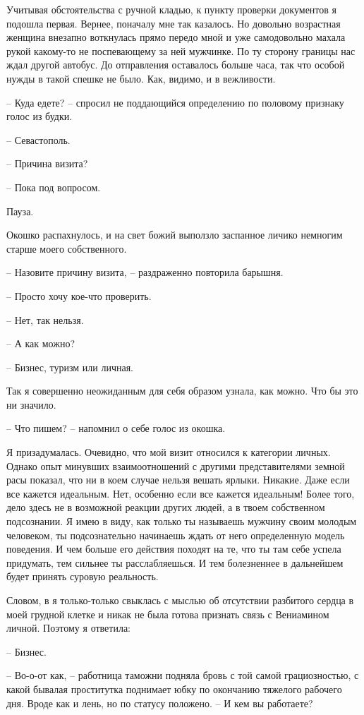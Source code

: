 \documentclass[
]{book}
\begin{document}
Учитывая обстоятельства с ручной кладью, к пункту проверки документов я подошла первая. Вернее, поначалу мне так казалось. Но довольно возрастная женщина внезапно воткнулась прямо передо мной и уже самодовольно махала рукой какому-то не поспевающему за ней мужчинке. По ту сторону границы нас ждал другой автобус. До отправления оставалось больше часа, так что особой нужды в такой спешке не было. Как, видимо, и в вежливости.

-- Куда едете? -- спросил не поддающийся определению по половому признаку голос из будки.

-- Севастополь.

-- Причина визита?

-- Пока под вопросом.

Пауза.

Окошко распахнулось, и на свет божий выползло заспанное личико немногим старше моего собственного.

-- Назовите причину визита, -- раздраженно повторила барышня.

-- Просто хочу кое-что проверить.

-- Нет, так нельзя.

-- А как можно?

-- Бизнес, туризм или личная.

Так я совершенно неожиданным для себя образом узнала, как можно. Что бы это ни значило.

-- Что пишем? -- напомнил о себе голос из окошка.

Я призадумалась. Очевидно, что мой визит относился к категории личных. Однако опыт минувших взаимоотношений с другими представителями земной расы показал, что ни в коем случае нельзя вешать ярлыки. Никакие. Даже если все кажется идеальным. Нет, особенно если все кажется идеальным! Более того, дело здесь не в возможной реакции других людей, а в твоем собственном подсознании. Я имею в виду, как только ты называешь мужчину своим молодым человеком, ты подсознательно начинаешь ждать от него определенную модель поведения. И чем больше его действия походят на те, что ты там себе успела придумать, тем сильнее ты расслабляешься. И тем болезненнее в дальнейшем будет принять суровую реальность.

Словом, в я только-только свыклась с мыслью об отсутствии разбитого сердца в моей грудной клетке и никак не была готова признать связь с Вениамином личной. Поэтому я ответила:

-- Бизнес.

-- Во-о-от как, -- работница таможни подняла бровь с той самой грациозностью, с какой бывалая проститутка поднимает юбку по окончанию тяжелого рабочего дня. Вроде как и лень, но по статусу положено. -- И кем вы работаете?
\end{document}
